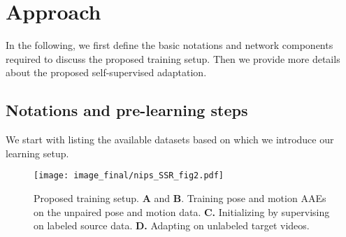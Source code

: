\documentclass{article}
\begin{document}
\iffalse
\textbf{Paired 3D pose datasets.}
Most of the in-the-wild human pose estimation datasets provide manually obtained 2D key-point annotations. 3D annotation requires a well-calibrated motion capture setup limiting it to be suitable only for in-studio scenarios \cite{ionescu2013human3}. The supervised models prone to overfit on such datasets leading to a poor generalization to unseen target scenarios. Addressing this, \cite{varol2017learning} introduced, SURREAL, a large-scale dataset of synthetically rendered images of human models articulated in poses collected from the MoCap samples \cite{cmumocap}. They access real scans to obtain realistic texture and shape of the body models which is obtained via a cumbersome, manual data collection procedure (CAESAR). In contrast, the proposed \texttt{Stickman} dataset only access the available MoCap samples without accessing any external body-scan dataset for better realism.
\fi











\section{Approach}\vspace{-3mm}
In the following, we first define the basic notations and network components required to discuss the proposed training setup. Then we provide more details about the proposed self-supervised adaptation.


\vspace{-2mm}
\subsection{Notations and pre-learning steps} 
\vspace{-2.5mm}
We start with listing the available datasets based on which we introduce our learning setup. 


\begin{wrapfigure}{r}{0.5\textwidth} \begin{center}
\texttt{[image: image\_final/nips\_SSR\_fig2.pdf]}
	\vspace{-3.8mm}
	\caption{
	Proposed training setup. \textbf{A} and \textbf{B}. Training pose and motion AAEs on the unpaired pose and motion data. \textbf{C.} Initializing  by supervising on labeled source data. \textbf{D.} Adapting  on unlabeled target videos.
}
    \vspace{-7.8mm}
    \label{fig:stickman}  
\end{center}
\end{wrapfigure}
\end{document}
